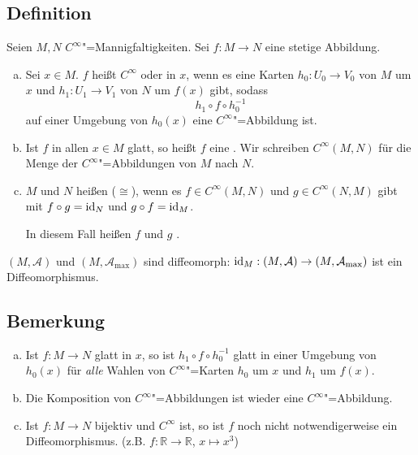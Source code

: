 \subsection[Definition: Differenzierbarkeit einer Abbildung $f : M \to N$]{Definition} %
\label{sub:156}
Seien $M,N$ $C^\infty$"=Mannigfaltigkeiten. Sei $f : M \to N$ eine stetige Abbildung.
\begin{enumerate}[a)]
	\item Sei $x \in M$. $f$ heißt $C^\infty$ oder  in $x$, wenn es eine Karten $h_0 : U_0 \to V_0$ von $M$ um $x$ und 
	$h_1 : U_1 \to V_1$ von $N$ um $f(x)$ gibt, sodass 
	\[
		h_1 \circ f \circ h_0 ^{-1}
	\]
	auf einer Umgebung von $h_0(x)$ eine $C^\infty$"=Abbildung ist.
	\item Ist $f$ in allen $x \in M$ glatt, so heißt $f$ eine . Wir schreiben $C^\infty(M,N)$ für die Menge
	der $C^\infty$"=Abbildungen von $M$ nach $N$.
	\item $M$ und $N$ heißen  ($\cong$), wenn es $f \in C^\infty(M,N)$ und $g \in C^\infty(N,M)$ 
	gibt mit $f \circ g = \operatorname{id}_N$ und $g \circ f = \operatorname{id}_M$. 
	
	In diesem Fall heißen $f$ und $g$ . 
\end{enumerate}
$(M,\mathcal{A})$ und $(M, \mathcal{A}_\mathrm{max})$ sind diffeomorph: $\operatorname{id}_M : (M,\mathcal{A}) \to (M, \mathcal{A}_\mathrm{max})$ ist ein Diffeomorphismus.

\subsection[Bemerkungen zur Definition von $C^\infty$]{Bemerkung} %
\label{sub:157}
\begin{enumerate}[a)]
	\item Ist $f : M \to N$ glatt in $x$, so ist $h_1 \circ f \circ h_0 ^{-1}$ glatt in einer Umgebung von $h_0(x)$ für \emph{alle} Wahlen von $C^\infty$"=Karten
	$h_0$ um $x$ und $h_1$ um $f(x)$.
	\item Die Komposition von $C^\infty$"=Abbildungen ist wieder eine $C^\infty$"=Abbildung.
	\item Ist $f : M \to N$ bijektiv und $C^\infty$ ist, so ist $f$ noch nicht notwendigerweise ein Diffeomorphismus. (z.B. $f : \mathds{R} \to \mathds{R}$, $x \mapsto x^3$)
\end{enumerate}

